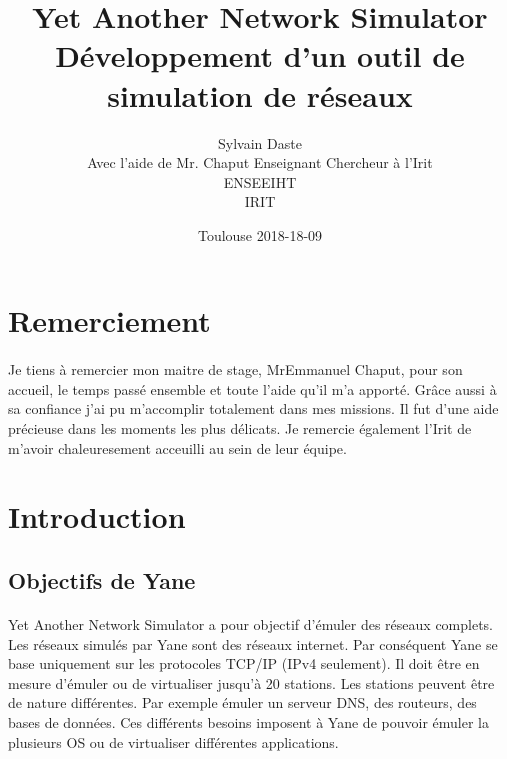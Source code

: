 \documentclass{article}
\begin{document}
	\title{Yet Another Network Simulator\\Développement d'un outil de simulation de réseaux}
	\date{Toulouse 2018-18-09}
	\author{Sylvain Daste\\Avec l'aide de Mr. Chaput Enseignant Chercheur à l'Irit\\ENSEEIHT\\IRIT}
	\maketitle



  	\newpage
	\tableofcontents
  	\newpage
	
	
	\section{Remerciement}
	\paragraph{}
	Je tiens à remercier mon maitre de stage, MrEmmanuel Chaput, pour son accueil, le temps passé ensemble et toute l'aide qu'il m'a apporté. Grâce aussi à sa confiance j'ai pu m'accomplir totalement dans mes missions. Il fut d'une aide précieuse dans les moments les plus délicats. Je remercie également l'Irit de m'avoir chaleuresement acceuilli au sein de leur équipe.
	\newpage


	\section{Introduction}


	\subsection{Objectifs de Yane}
	
	\paragraph{}
	Yet Another Network Simulator a pour objectif d'émuler des réseaux complets. Les réseaux simulés par Yane sont des réseaux internet. Par conséquent Yane se base uniquement sur les protocoles TCP/IP (IPv4 seulement). Il doit être en mesure d'émuler ou de virtualiser jusqu'à 20 stations. Les stations peuvent être de nature différentes. Par exemple émuler un serveur DNS, des routeurs, des bases de données. Ces différents besoins imposent à Yane de pouvoir émuler la plusieurs OS ou de virtualiser différentes applications. 
	
\end{document}
